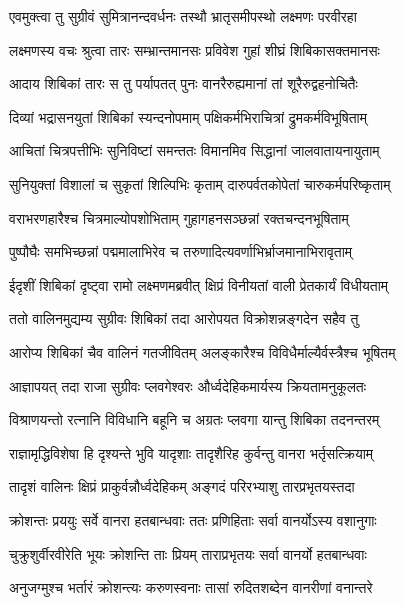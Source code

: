 \twolineshloka
{एवमुक्त्वा तु सुग्रीवं सुमित्रानन्दवर्धनः}
{तस्थौ भ्रातृसमीपस्थो लक्ष्मणः परवीरहा} %

\twolineshloka
{लक्ष्मणस्य वचः श्रुत्वा तारः सम्भ्रान्तमानसः}
{प्रविवेश गुहां शीघ्रं शिबिकासक्तमानसः} %

\twolineshloka
{आदाय शिबिकां तारः स तु पर्यापतत् पुनः}
{वानरैरुह्यमानां तां शूरैरुद्वहनोचितैः} %

\twolineshloka
{दिव्यां भद्रासनयुतां शिबिकां स्यन्दनोपमाम्}
{पक्षिकर्मभिराचित्रां द्रुमकर्मविभूषिताम्} %

\twolineshloka
{आचितां चित्रपत्तीभिः सुनिविष्टां समन्ततः}
{विमानमिव सिद्धानां जालवातायनायुताम्} %

\twolineshloka
{सुनियुक्तां विशालां च सुकृतां शिल्पिभिः कृताम्}
{दारुपर्वतकोपेतां चारुकर्मपरिष्कृताम्} %

\twolineshloka
{वराभरणहारैश्च चित्रमाल्योपशोभिताम्}
{गुहागहनसञ्छन्नां रक्तचन्दनभूषिताम्} %

\twolineshloka
{पुष्पौघैः समभिच्छन्नां पद्ममालाभिरेव च}
{तरुणादित्यवर्णाभिर्भ्राजमानाभिरावृताम्} %

\twolineshloka
{ईदृशीं शिबिकां दृष्ट्वा रामो लक्ष्मणमब्रवीत्}
{क्षिप्रं विनीयतां वाली प्रेतकार्यं विधीयताम्} %

\twolineshloka
{ततो वालिनमुद्यम्य सुग्रीवः शिबिकां तदा}
{आरोपयत विक्रोशन्नङ्गदेन सहैव तु} %

\twolineshloka
{आरोप्य शिबिकां चैव वालिनं गतजीवितम्}
{अलङ्कारैश्च विविधैर्माल्यैर्वस्त्रैश्च भूषितम्} %

\twolineshloka
{आज्ञापयत् तदा राजा सुग्रीवः प्लवगेश्वरः}
{और्ध्वदेहिकमार्यस्य क्रियतामनुकूलतः} %

\twolineshloka
{विश्राणयन्तो रत्नानि विविधानि बहूनि च}
{अग्रतः प्लवगा यान्तु शिबिका तदनन्तरम्} %

\twolineshloka
{राज्ञामृद्धिविशेषा हि दृश्यन्ते भुवि यादृशाः}
{तादृशैरिह कुर्वन्तु वानरा भर्तृसत्क्रियाम्} %

\twolineshloka
{तादृशं वालिनः क्षिप्रं प्राकुर्वन्नौर्ध्वदेहिकम्}
{अङ्गदं परिरभ्याशु तारप्रभृतयस्तदा} %

\twolineshloka
{क्रोशन्तः प्रययुः सर्वे वानरा हतबान्धवाः}
{ततः प्रणिहिताः सर्वा वानर्योऽस्य वशानुगाः} %

\twolineshloka
{चुक्रुशुर्वीरवीरेति भूयः क्रोशन्ति ताः प्रियम्}
{ताराप्रभृतयः सर्वा वानर्यो हतबान्धवाः} %

\twolineshloka
{अनुजग्मुश्च भर्तारं क्रोशन्त्यः करुणस्वनाः}
{तासां रुदितशब्देन वानरीणां वनान्तरे} %

